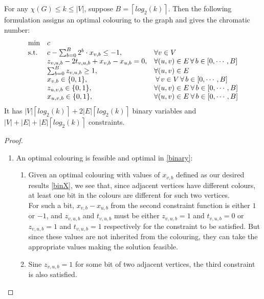 \begin{proposition}
For any $\chi(G) \leq k \leq |V|$, suppose $B = \left \lceil{log_2(k)}\right \rceil$. Then the following formulation assigns an optimal colouring to the graph and gives the chromatic number:
\begin{align}\label{binary}
\begin{array}{ll@{}ll}
\text{min} &c&\\
\text{s.t.} 
&c - \sum_{b = 0}^{B}{2^b\cdot x_{v,b}} \leq -1,& \forall v\in V\\
&z_{v,u,b}-2t_{v,u,b}+x_{v,b}-x_{u,b} = 0,\quad & \forall (u,v)\in E \, \forall \, b \in [0,\cdots ,B ] \\
&\sum_{b = 0}^{B}{z_{v,u,b}} \geq 1,& \forall (u,v) \in E\\
&x_{v,b}\in\{0,1\},& \: \forall \, v \in V \, \forall \, b \in [0,\cdots ,B]\\
&z_{u,v,b}\in\{0,1\},& \forall (u,v) \in E \: \forall \, b \in [0,\cdots ,B]\\
&x_{u,v,b}\in\{0,1\},& \forall (u,v) \in E \: \forall \, b \in [0,\cdots ,B]\\
\end{array}
\end{align}
\noindent It has $|V|\left \lceil{log_2(k)}\right \rceil + 2|E|\left \lceil{log_2(k)}\right \rceil$ binary variables and $|V|+|E|+|E|\left \lceil{log_2(k)}\right \rceil$ constraints.
\begin{proof}
\begin{enumerate}
\item An optimal colouring is feasible and optimal in \ref{binary}:\\
\begin{enumerate}
\item Given an optimal colouring with values of $x_{v,b}$ defined as our desired results \ref{binX}, we see that, since adjacent vertices have different colours, at least one bit in the colours are different for such two vertices.\\
For such a bit, $x_{v,b}-x_{u,b}$ from the second constraint function is either $1$ or $-1$, and $z_{v,u,b}$ and $t_{v,u,b}$ must be either $z_{v,u,b} = 1$ and $t_{v,u,b} = 0$ or $z_{v,u,b} = 1$ and $t_{v,u,b} = 1$ respectively for the constraint to be satisfied. But since these values are not inherited from the colouring, they can take the appropriate values making the solution feasible. 
\item Sine $z_{v,u,b} = 1$ for some bit of two adjacent vertices, the third constraint is also satisfied.

\end{enumerate}
\end{enumerate}
\end{proof}
\end{proposition}
